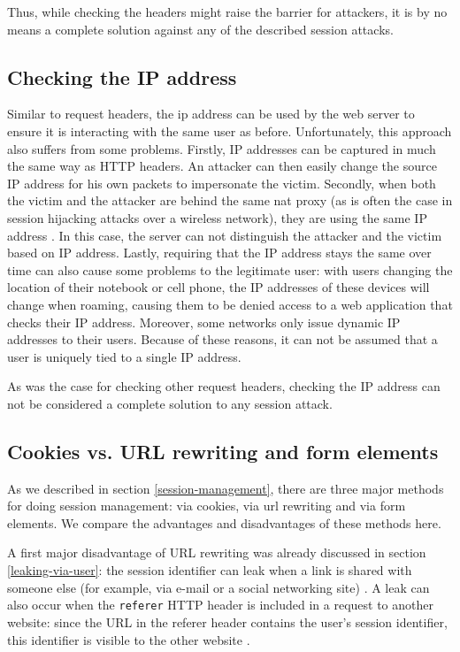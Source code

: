 Thus, while checking the headers might raise the barrier for attackers, it is by no means a complete solution against any of the described session attacks.

\subsection{Checking the IP address}

Similar to request headers, the \gls{ip} address can be used by the web server to ensure it is interacting with the same user as before. Unfortunately, this approach also suffers from some problems. Firstly, IP addresses can be captured in much the same way as HTTP headers. An attacker can then easily change the source IP address for his own packets to impersonate the victim. Secondly, when both the victim and the attacker are behind the same \gls{nat} proxy (as is often the case in session hijacking attacks over a wireless network), they are using the same IP address \cite{Johns2011}. In this case, the server can not distinguish the attacker and the victim based on IP address. Lastly, requiring that the IP address stays the same over time can also cause some problems to the legitimate user: with users changing the location of their notebook or cell phone, the IP addresses of these devices will change when roaming, causing them to be denied access to a web application that checks their IP address. Moreover, some networks only issue dynamic IP addresses to their users. Because of these reasons, it can not be assumed that a user is uniquely tied to a single IP address.

As was the case for checking other request headers, checking the IP address can not be considered a complete solution to any session attack.

\subsection{Cookies vs. URL rewriting and form elements}\label{url-vs-cookies}

As we described in section \ref{session-management}, there are three major methods for doing session management: via \glspl{cookie}, via \gls{url} rewriting and via form elements. We compare the advantages and disadvantages of these methods here.

A first major disadvantage of URL rewriting was already discussed in section \ref{leaking-via-user}: the session identifier can leak when a link is shared with someone else (for example, via e-mail or a social networking site) \cite{Johnston2004}. A leak can also occur when the \texttt{referer} HTTP header is included in a request to another website: since the URL in the referer header contains the user's session identifier, this identifier is visible to the other website \cite{Fu2001}.

